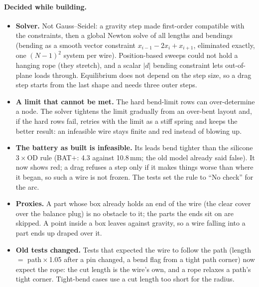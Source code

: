 \paragraph{Decided while building.}
\begin{itemize}[nosep]
  \item \textbf{Solver.} Not Gauss--Seidel: a gravity step made first-order compatible with the constraints, then a
        global Newton solve of all lengths and bendings (bending as a smooth vector constraint $x_{i-1}-2x_i+x_{i+1}$,
        eliminated exactly, one $(N-1)^2$ system per wire). Position-based sweeps could not hold a hanging rope (they
        stretch), and a scalar $|d|$ bending constraint lets out-of-plane loads through. Equilibrium does not depend on the
        step size, so a drag step starts from the last shape and needs three outer steps.
  \item \textbf{A limit that cannot be met.} The hard bend-limit rows can over-determine a node. The solver tightens
        the limit gradually from an over-bent layout and, if the hard rows fail, retries with the limit as a stiff
        spring and keeps the better result: an infeasible wire stays finite and red instead of blowing up.
  \item \textbf{The battery as built is infeasible.} Its leads bend tighter than the silicone 3\,$\times$\,OD rule
        (BAT$+$: 4.3 against 10.8\,mm; the old model already said  false). It now shows red; a drag refuses
        a step only if it makes things worse than where it began, so such a wire is not frozen. The tests set the rule
        to ``No check'' for the arc.
  \item \textbf{Proxies.} A part whose box already holds an end of the wire (the clear cover over the balance plug) is
        no obstacle to it; the parts the ends sit on are skipped. A point inside a box leaves against gravity, so a wire
        falling into a part ends up draped over it.
  \item \textbf{Old tests changed.} Tests that expected the wire to follow the path (length $=$ path\,$\times$\,1.05 after a
        pin changed, a bend flag from a tight path corner) now expect the rope: the cut length is the wire's own, and a
        rope relaxes a path's tight corner. Tight-bend cases use a cut length too short for the radius.
\end{itemize}

